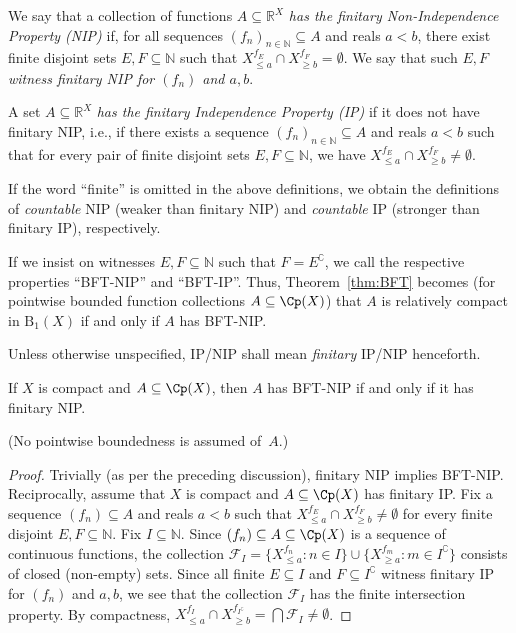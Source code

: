 \begin{definition}\label{def:NIP-fns}
    We say that a collection of functions \emph{$A\subseteq \mathbb{R}^X$ has the finitary Non-Independence Property (NIP)} if, for all sequences $(f_n)_{n\in\mathbb{N}}\subseteq A$ and reals $a<b$, there exist finite disjoint sets $E,F\subseteq\mathbb{N}$ such that $X_{\le a}^{f_E} \cap X_{\ge b}^{f_F} = \emptyset$.
    We say that such $E, F$ \emph{witness finitary NIP for $(f_n)$ and $a, b$}.

    A set $A\subseteq \mathbb{R}^X$ \emph{has the finitary Independence Property (IP)} if it does not have finitary NIP, i.e., if there exists a sequence $(f_n)_{n\in\mathbb{N}}\subseteq A$ and reals $a<b$ such that for every pair of finite disjoint sets $E,F\subseteq\mathbb{N}$, we have $X_{\le a}^{f_E} \cap X_{\ge b}^{f_F} \ne \emptyset$.
\end{definition}

If the word ``finite'' is omitted in the above definitions, we obtain the definitions of \emph{countable} NIP (weaker than finitary NIP) and \emph{countable} IP (stronger than finitary IP), respectively.

If we insist on witnesses $E,F\subseteq \mathbb{N}$ such that $F = E^{\complement}$, we call the respective properties ``BFT-NIP'' and ``BFT-IP''.
Thus, Theorem~\ref{thm:BFT} becomes (for pointwise bounded function collections $A\subseteq \Cp(X)$) that $A$ is relatively compact in $\mathrm{B}_1(X)$ if and only if $A$ has BFT-NIP.

Unless otherwise unspecified, IP/NIP shall mean \emph{finitary} IP/NIP henceforth.

\begin{proposition}\label{prop:BFT-finitary-cpct}
    If $X$ is compact and $A\subseteq \Cp(X)$, then $A$ has BFT-NIP if and only if it has finitary NIP.
\end{proposition}
(No pointwise boundedness is assumed of~$A$.)
\begin{proof}
    Trivially (as per the preceding discussion), finitary NIP implies BFT-NIP.
    Reciprocally, assume that $X$ is compact and $A\subseteq \Cp(X)$ has finitary IP.
    Fix a sequence $(f_n)\subseteq A$ and reals $a<b$ such that $X^{f_E}_{\le a}\cap X^{f_F}_{\ge b}\neq\emptyset$ for every finite disjoint $E,F\subseteq\mathbb{N}$.
    Fix $I\subseteq\mathbb{N}$.
    Since $(f_n)\subseteq A\subseteq \Cp(X)$ is a sequence of continuous functions, the collection $\mathcal{F}_I=\{X^{f_n}_{\le a}:n\in I\}\cup\{X^{f_m}_{\ge a}:m\in I^{\complement}\}$ consists of closed (non-empty) sets.
    Since all finite $E\subseteq I$ and $F\subseteq I^{\complement}$ witness finitary IP for $(f_n)$ and $a, b$, we see that the collection $\mathcal{F}_I$ has the finite intersection property.
    By compactness, $X^{f_I}_{\le a}\cap X^{f_{I^{\complement}}}_{\ge b} = \bigcap\mathcal{F}_I\neq\emptyset$.
\end{proof}

